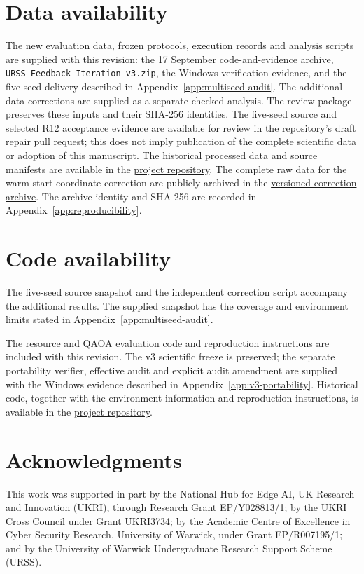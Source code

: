 \documentclass[a4paper,onecolumn,11pt,unpublished]{quantumarticle}
\theoremstyle{remark}
\begin{document}
\FloatBarrier
\section*{Data availability}
The new evaluation data, frozen protocols, execution records and analysis scripts
are supplied with this revision: the 17 September code-and-evidence archive,
\nolinkurl{URSS_Feedback_Iteration_v3.zip}, the Windows verification evidence,
and the five-seed delivery described in Appendix~\ref{app:multiseed-audit}.
The additional data corrections are supplied as a separate checked analysis.
The review package preserves these inputs and their SHA-256 identities.
The five-seed source and selected R12 acceptance evidence are available for
review in the repository's draft repair pull request; this does not imply
publication of the complete scientific data or adoption of this manuscript.
The historical
processed data and source manifests
are available in the
\href{https://github.com/rrocy6/Exact-mixed-locality-representation-selection-for-resource-constrained-QAOA}{project
repository}. The complete raw data for the warm-start coordinate correction are publicly
archived in the
\href{https://github.com/rrocy6/Exact-mixed-locality-representation-selection-for-resource-constrained-QAOA/blob/efaa1ce60fbc9984006472c4b2672578027fac78/delivery/20260913/archives/URSS_WARMSTART_CORRECTION_EXECUTED_v1.zip}{versioned correction archive}.
The archive identity and SHA-256 are recorded in
Appendix~\ref{app:reproducibility}.

\section*{Code availability}
The five-seed source snapshot and the independent correction script accompany
the additional results. The supplied snapshot has the coverage and environment
limits stated in Appendix~\ref{app:multiseed-audit}.

The resource and QAOA evaluation code and reproduction instructions are included with this revision. The v3 scientific freeze is preserved; the separate portability verifier, effective audit and explicit audit amendment are supplied with the Windows evidence described in Appendix~\ref{app:v3-portability}. Historical code, together with the
environment information and reproduction instructions, is available in the
\href{https://github.com/rrocy6/Exact-mixed-locality-representation-selection-for-resource-constrained-QAOA}{project
repository}.

\section*{Acknowledgments}
This work was supported in part by the National Hub for Edge AI,
UK Research and Innovation (UKRI), through Research Grant EP/Y028813/1;
by the UKRI Cross Council under Grant UKRI3734;
by the Academic Centre of Excellence in Cyber Security Research,
University of Warwick, under Grant EP/R007195/1;
and by the University of Warwick Undergraduate Research Support Scheme
(URSS).
\end{document}
